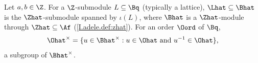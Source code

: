 Let $a,b\in\Z$. For a $\Z$-submodule $L\subseteq\Bq$ (typically a lattice), $\Lhat\subseteq\Bhat$ is the $\Zhat$-submodule spanned by
$\iota(L)$, where $\Bhat$ is a $\Zhat$-module through $\Zhat\subseteq\Af$ (\cref{I.adele.def:zhat}). For an order $\Oord$ of $\Bq$,
\[
  \Ohat^\times=\{u\in\Bhat^\times:u\in\Ohat\text{ and }u^{-1}\in\Ohat\},
\]
a subgroup of $\Bhat^\times$.
